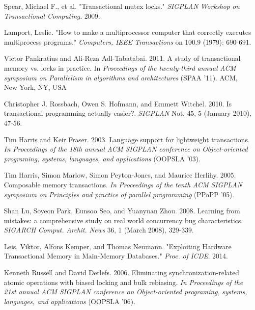 \documentclass{sigplanconf}
\begin{document}
\begin{thebibliography}{}
  Spear, Michael F., et al. "Transactional mutex locks." \emph{SIGPLAN
    Workshop on Transactional Computing.} 2009.

  Lamport, Leslie. "How to make a multiprocessor computer that
  correctly executes multiprocess programs." \emph{Computers, IEEE
    Transactions} on 100.9 (1979): 690-691.

  Victor Pankratius and Ali-Reza Adl-Tabatabai. 2011. A study of
  transactional memory vs. locks in practice. In \emph{Proceedings of
    the twenty-third annual ACM symposium on Parallelism in algorithms
    and architectures} (SPAA '11). ACM, New York, NY, USA

  Christopher J. Rossbach, Owen S. Hofmann, and Emmett
  Witchel. 2010. Is transactional programming actually
  easier?. \emph{SIGPLAN} Not. 45, 5 (January 2010), 47-56.

  Tim Harris and Keir Fraser. 2003. Language support for lightweight
  transactions. \emph{In Proceedings of the 18th annual ACM SIGPLAN
    conference on Object-oriented programing, systems, languages, and
    applications} (OOPSLA '03).

  Tim Harris, Simon Marlow, Simon Peyton-Jones, and Maurice
  Herlihy. 2005. Composable memory transactions. \emph{In Proceedings
    of the tenth ACM SIGPLAN symposium on Principles and practice of
    parallel programming} (PPoPP '05).

  Shan Lu, Soyeon Park, Eunsoo Seo, and Yuanyuan Zhou. 2008. Learning
  from mistakes: a comprehensive study on real world concurrency bug
  characteristics. \emph{SIGARCH Comput. Archit. News} 36, 1 (March 2008),
  329-339.

  Leis, Viktor, Alfons Kemper, and Thomas Neumann. "Exploiting
  Hardware Transactional Memory in Main-Memory Databases."
  \emph{Proc. of ICDE}. 2014.

  Kenneth Russell and David Detlefs. 2006. Eliminating
  synchronization-related atomic operations with biased locking and
  bulk rebiasing. \emph{In Proceedings of the 21st annual ACM SIGPLAN
    conference on Object-oriented programing, systems, languages, and
    applications} (OOPSLA '06).

\end{thebibliography}
\end{document}

